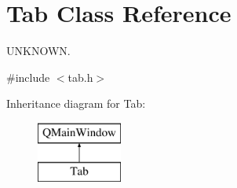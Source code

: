 \hypertarget{class_tab}{}\section{Tab Class Reference}
\label{class_tab}


U\+N\+K\+N\+O\+W\+N.  




{\ttfamily \#include $<$tab.\+h$>$}

Inheritance diagram for Tab\+:\begin{figure}[H]
\begin{center}
\leavevmode
\includegraphics[height=2.000000cm]{class_tab}
\end{center}
\end{figure}
